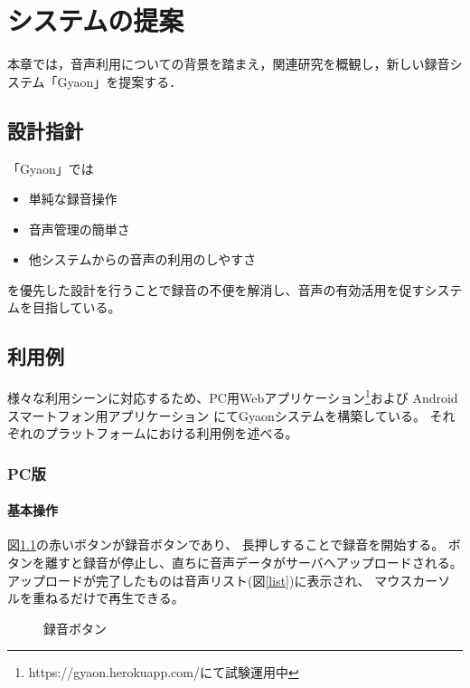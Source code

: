 \chapter{システムの提案}
\label{chap:proposal}

本章では，音声利用についての背景を踏まえ，関連研究を概観し，新しい録音システム「Gyaon」を提案する．

\newpage

\section{設計指針}

「Gyaon」では
\begin{itemize}
\item 単純な録音操作
\item 音声管理の簡単さ
\item 他システムからの音声の利用のしやすさ
\end{itemize}
を優先した設計を行うことで録音の不便を解消し、音声の有効活用を促すシステムを目指している。

\section{利用例}
様々な利用シーンに対応するため、PC用Webアプリケーション\footnote{\textsf{https://gyaon.herokuapp.com/にて試験運用中}}および
Androidスマートフォン用アプリケーション
にてGyaonシステムを構築している。
それぞれのプラットフォームにおける利用例を述べる。

\subsection{PC版}

\subsubsection{基本操作}
図\ref{button}の赤いボタンが録音ボタンであり、
長押しすることで録音を開始する。
ボタンを離すと録音が停止し、直ちに音声データがサーバへアップロードされる。
アップロードが完了したものは音声リスト(図\ref{list})に表示され、
マウスカーソルを重ねるだけで再生できる。

\begin{figure}[H]
\centering
{}
\caption{録音ボタン}
\label{button}
\end{figure}

